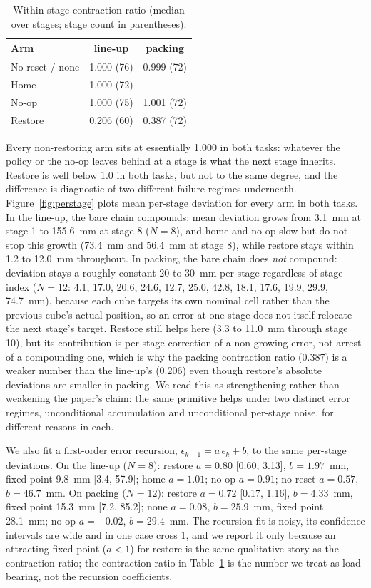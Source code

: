 \documentclass[11pt]{article}
\begin{document}
\begin{table}[h]
\centering
\caption{Within-stage contraction ratio (median over stages; stage count in
parentheses).}
\label{tab:contraction}
\begin{tabular}{lcc}
\toprule
Arm & line-up & packing \\
\midrule
No reset / none & 1.000 (76) & 0.999 (72) \\
Home            & 1.000 (72) & --- \\
No-op           & 1.000 (75) & 1.001 (72) \\
Restore         & 0.206 (60) & 0.387 (72) \\
\bottomrule
\end{tabular}
\end{table}

Every non-restoring arm sits at essentially 1.000 in both tasks: whatever
the policy or the no-op leaves behind at a stage is what the next stage
inherits. Restore is well below 1.0 in both tasks, but not to the same
degree, and the difference is diagnostic of two different failure regimes
underneath. Figure~\ref{fig:perstage} plots mean per-stage deviation for
every arm in both tasks. In the line-up, the bare chain compounds: mean
deviation grows from 3.1~mm at stage 1 to 155.6~mm at stage 8 ($N=8$), and
home and no-op slow but do not stop this growth (73.4~mm and 56.4~mm at
stage 8), while restore stays within 1.2 to 12.0~mm throughout. In packing,
the bare chain does \emph{not} compound: deviation stays a roughly constant
20 to 30~mm per stage regardless of stage index ($N=12$: 4.1, 17.0, 20.6,
24.6, 12.7, 25.0, 42.8, 18.1, 17.6, 19.9, 29.9, 74.7~mm), because each cube
targets its own nominal cell rather than the previous cube's actual
position, so an error at one stage does not itself relocate the next
stage's target. Restore still helps here (3.3 to 11.0~mm through stage 10),
but its contribution is per-stage correction of a non-growing error, not
arrest of a compounding one, which is why the packing contraction ratio
(0.387) is a weaker number than the line-up's (0.206) even though restore's
absolute deviations are smaller in packing. We read this as strengthening
rather than weakening the paper's claim: the same primitive helps under two
distinct error regimes, unconditional accumulation and unconditional
per-stage noise, for different reasons in each.

We also fit a first-order error recursion, $\epsilon_{k+1} = a\,\epsilon_k +
b$, to the same per-stage deviations. On the line-up ($N=8$): restore
$a = 0.80$ [0.60, 3.13], $b = 1.97$~mm, fixed point 9.8~mm [3.4, 57.9]; home
$a = 1.01$; no-op $a = 0.91$; no reset $a = 0.57$, $b = 46.7$~mm. On packing
($N=12$): restore $a = 0.72$ [0.17, 1.16], $b = 4.33$~mm, fixed point
15.3~mm [7.2, 85.2]; none $a = 0.08$, $b = 25.9$~mm, fixed point 28.1~mm;
no-op $a = -0.02$, $b = 29.4$~mm. The recursion fit is noisy, its confidence
intervals are wide and in one case cross 1, and we report it only because
an attracting fixed point ($a<1$) for restore is the same qualitative story
as the contraction ratio; the contraction ratio in Table~\ref{tab:contraction}
is the number we treat as load-bearing, not the recursion coefficients.
\end{document}
